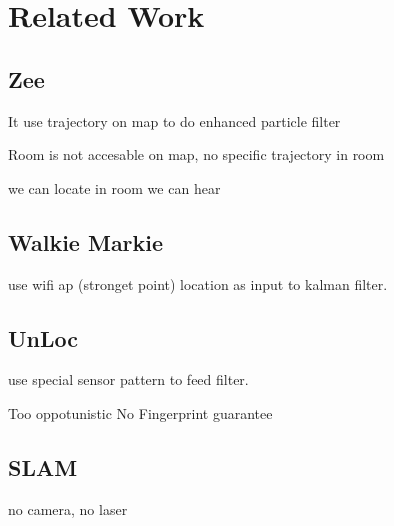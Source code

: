 \section{Related Work}
\label{sec:related}



\subsection{Zee}
It use trajectory on map to do enhanced particle filter


Room is not accesable on map, no specific trajectory in room


we can locate in room
we can hear



\subsection{Walkie Markie}
use wifi ap (stronget point) location as input to kalman filter.



\subsection{UnLoc}
use special sensor pattern to feed filter.

Too oppotunistic
No Fingerprint guarantee



\subsection{SLAM}

no camera, no laser











